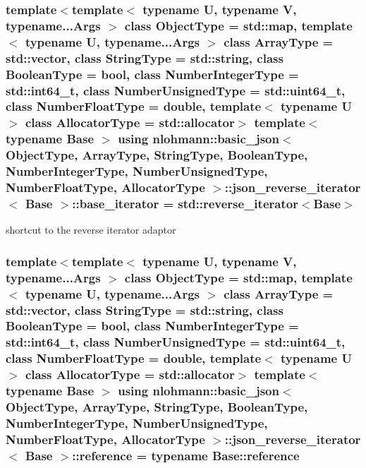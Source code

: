 \subsubsection[{\texorpdfstring{base\+\_\+iterator}{base_iterator}}]{\setlength{\rightskip}{0pt plus 5cm}template$<$template$<$ typename U, typename V, typename...\+Args $>$ class Object\+Type = std\+::map, template$<$ typename U, typename...\+Args $>$ class Array\+Type = std\+::vector, class String\+Type  = std\+::string, class Boolean\+Type  = bool, class Number\+Integer\+Type  = std\+::int64\+\_\+t, class Number\+Unsigned\+Type  = std\+::uint64\+\_\+t, class Number\+Float\+Type  = double, template$<$ typename U $>$ class Allocator\+Type = std\+::allocator$>$ template$<$typename Base $>$ using {\bf nlohmann\+::basic\+\_\+json}$<$ Object\+Type, Array\+Type, String\+Type, Boolean\+Type, Number\+Integer\+Type, Number\+Unsigned\+Type, Number\+Float\+Type, Allocator\+Type $>$\+::{\bf json\+\_\+reverse\+\_\+iterator}$<$ Base $>$\+::{\bf base\+\_\+iterator} =  std\+::reverse\+\_\+iterator$<$Base$>$}\hypertarget{classnlohmann_1_1basic__json_1_1json__reverse__iterator_a9ebc4c99e6fc90c965af0f39ad2ca70e}{}\label{classnlohmann_1_1basic__json_1_1json__reverse__iterator_a9ebc4c99e6fc90c965af0f39ad2ca70e}


shortcut to the reverse iterator adaptor 

\subsubsection[{\texorpdfstring{reference}{reference}}]{\setlength{\rightskip}{0pt plus 5cm}template$<$template$<$ typename U, typename V, typename...\+Args $>$ class Object\+Type = std\+::map, template$<$ typename U, typename...\+Args $>$ class Array\+Type = std\+::vector, class String\+Type  = std\+::string, class Boolean\+Type  = bool, class Number\+Integer\+Type  = std\+::int64\+\_\+t, class Number\+Unsigned\+Type  = std\+::uint64\+\_\+t, class Number\+Float\+Type  = double, template$<$ typename U $>$ class Allocator\+Type = std\+::allocator$>$ template$<$typename Base $>$ using {\bf nlohmann\+::basic\+\_\+json}$<$ Object\+Type, Array\+Type, String\+Type, Boolean\+Type, Number\+Integer\+Type, Number\+Unsigned\+Type, Number\+Float\+Type, Allocator\+Type $>$\+::{\bf json\+\_\+reverse\+\_\+iterator}$<$ Base $>$\+::{\bf reference} =  typename Base\+::reference}\hypertarget{classnlohmann_1_1basic__json_1_1json__reverse__iterator_a7265535f39299824f9712a2ca15013c3}{}\label{classnlohmann_1_1basic__json_1_1json__reverse__iterator_a7265535f39299824f9712a2ca15013c3}


